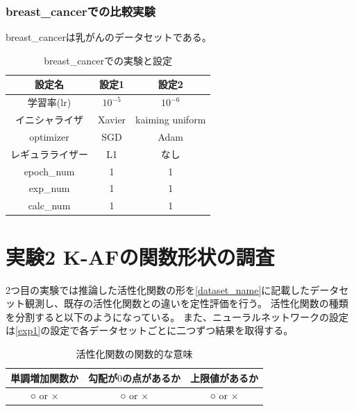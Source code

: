 \vspace{-15mm} 


\subsubsection{breast\_cancerでの比較実験}
\label{impl:breastcancer}

breast\_cancerは乳がんのデータセットである。

\begin{table}[htbp]
    \begin{center}
        \caption{breast\_cancerでの実験と設定}
        \vspace{5mm} 
        \begin{tabular}{ |c|c|c| }
        設定名 & 設定1 & 設定2 \\
        \hline
        学習率(lr)         & $ 10^{-5} $ & $ 10^{-6} $ \\
        イニシャライザ       & Xavier & kaiming uniform \\
        optimizer           & SGD & Adam \\
        レギュラライザー     & L1 & なし \\
        epoch\_num       & 1 &  1 \\
        exp\_num         & 1 & 1 \\
        calc\_num        & 1 & 1 \\
        \end{tabular}
    \end{center}
\end{table}


\vspace{-5mm} 

\section{実験2 K-AFの関数形状の調査}
\label{exp2}

2つ目の実験では推論した活性化関数の形を\ref{dataset_name}に記載したデータセット観測し、既存の活性化関数との違いを定性評価を行う。
活性化関数の種類を分割すると以下のようになっている。
また、ニューラルネットワークの設定は\ref{exp1}の設定で各データセットごとに二つずつ結果を取得する。

\begin{table}[htbp]
    \begin{center}
        \caption{活性化関数の関数的な意味}
        \label{af-class}
        \vspace{5mm} 
        \begin{tabular}{ |c|c|c| }
        単調増加関数か & 勾配が$ 0 $の点があるか & 上限値があるか   \\
        \hline
        ○ or × & ○ or × & ○ or ×  \\
        \end{tabular}
    \end{center}
\end{table}

